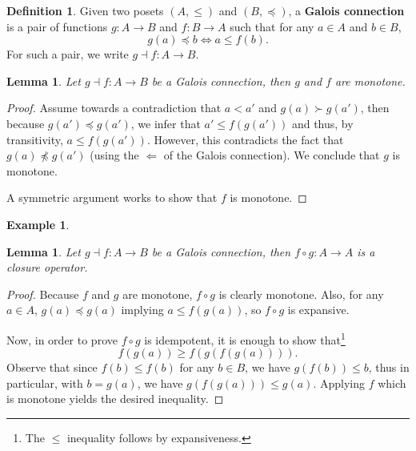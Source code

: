 \documentclass{tufte-handout} %
\newtheorem{lem}[thm]{Lemma}
\theoremstyle{definition}
\newtheorem{defn}[thm]{Definition}
\newtheorem{exmp}[thm]{Example}
\theoremstyle{remark}
\newcommand{\0}{\textsf{0}}
\newcommand{\1}{\textsf{1}}
\begin{document}
\begin{defn}
	Given two posets $(A, \leq)$ and $(B, \preceq)$, a \textbf{Galois connection} is a pair of functions $g: A \rightarrow B$ and $f: B\rightarrow A$ such that for any $a \in A$ and $b\in B$, \[g(a) \preceq b \Leftrightarrow a \leq f(b).\]
	For such a pair, we write $g \dashv f:A\rightarrow B$.
\end{defn}
\begin{lem}
	Let $g \dashv f: A\rightarrow B$ be a Galois connection, then $g$ and $f$ are monotone.
\end{lem}
\begin{proof}
	Assume towards a contradiction that $a < a'$ and $g(a) \succ g(a')$, then because $g(a') \preceq g(a')$, we infer that $a' \leq f(g(a'))$ and thus, by transitivity, $a \leq f(g(a'))$. However, this contradicts the fact that $g(a) \not\preceq g(a')$ (using the $\Leftarrow$ of the Galois connection). We conclude that $g$ is monotone.
	
	A symmetric argument works to show that $f$ is monotone.
\end{proof}
\begin{exmp}
\end{exmp}
\begin{lem}
	Let $g \dashv f:A \rightarrow B$ be a Galois connection, then $f\circ g: A\rightarrow A$ is a closure operator.
\end{lem}
\begin{proof}
	Because $f$ and $g$ are monotone, $f\circ g$ is clearly monotone. Also, for any $a \in A$, $g(a) \preceq g(a)$ implying $a \leq f(g(a))$, so $f\circ g$ is expansive.
	
	Now, in order to prove $f\circ g$ is idempotent, it is enough to show that\footnote{The $\leq$ inequality follows by expansiveness.} \[f(g(a)) \geq f(g(f(g(a)))).\]
	Observe that since $f(b) \leq f(b)$ for any $b\in B$, we have $g(f(b)) \leq b$, thus in particular, with $b = g(a)$, we have $g(f(g(a))) \leq g(a)$. Applying $f$ which is monotone yields the desired inequality.
\end{proof}
\end{document}
